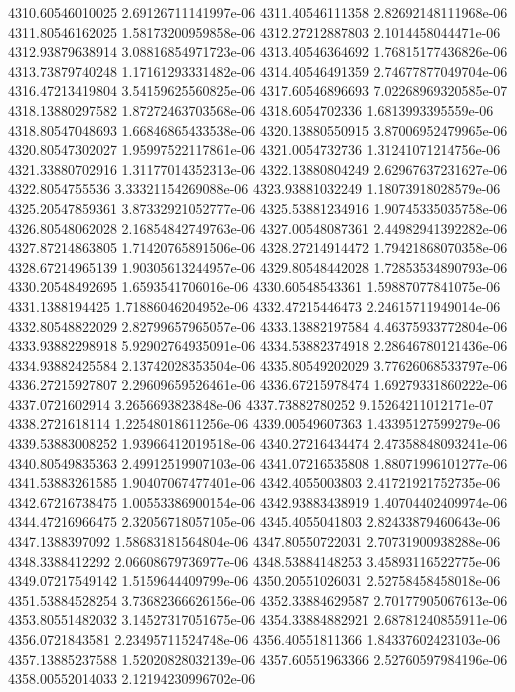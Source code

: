 {4310.60546010025 2.69126711141997e-06
4311.40546111358 2.82692148111968e-06
4311.80546162025 1.58173200959858e-06
4312.27212887803 2.1014458044471e-06
4312.93879638914 3.08816854971723e-06
4313.40546364692 1.76815177436826e-06
4313.73879740248 1.17161293331482e-06
4314.40546491359 2.74677877049704e-06
4316.47213419804 3.54159625560825e-06
4317.60546896693 7.02268969320585e-07
4318.13880297582 1.87272463703568e-06
4318.6054702336 1.6813993395559e-06
4318.80547048693 1.66846865433538e-06
4320.13880550915 3.87006952479965e-06
4320.80547302027 1.95997522117861e-06
4321.0054732736 1.31241071214756e-06
4321.33880702916 1.31177014352313e-06
4322.13880804249 2.62967637231627e-06
4322.8054755536 3.33321154269088e-06
4323.93881032249 1.18073918028579e-06
4325.20547859361 3.87332921052777e-06
4325.53881234916 1.90745335035758e-06
4326.80548062028 2.16854842749763e-06
4327.00548087361 2.44982941392282e-06
4327.87214863805 1.71420765891506e-06
4328.27214914472 1.79421868070358e-06
4328.67214965139 1.90305613244957e-06
4329.80548442028 1.72853534890793e-06
4330.20548492695 1.6593541706016e-06
4330.60548543361 1.59887077841075e-06
4331.1388194425 1.71886046204952e-06
4332.47215446473 2.24615711949014e-06
4332.80548822029 2.82799657965057e-06
4333.13882197584 4.46375933772804e-06
4333.93882298918 5.92902764935091e-06
4334.53882374918 2.28646780121436e-06
4334.93882425584 2.13742028353504e-06
4335.80549202029 3.77626068533797e-06
4336.27215927807 2.29609659526461e-06
4336.67215978474 1.69279331860222e-06
4337.0721602914 3.2656693823848e-06
4337.73882780252 9.15264211012171e-07
4338.2721618114 1.22548018611256e-06
4339.00549607363 1.43395127599279e-06
4339.53883008252 1.93966412019518e-06
4340.27216434474 2.47358848093241e-06
4340.80549835363 2.49912519907103e-06
4341.07216535808 1.88071996101277e-06
4341.53883261585 1.90407067477401e-06
4342.4055003803 2.41721921752735e-06
4342.67216738475 1.00553386900154e-06
4342.93883438919 1.40704402409974e-06
4344.47216966475 2.32056718057105e-06
4345.4055041803 2.82433879460643e-06
4347.1388397092 1.58683181564804e-06
4347.80550722031 2.70731900938288e-06
4348.3388412292 2.06608679736977e-06
4348.53884148253 3.45893116522775e-06
4349.07217549142 1.5159644409799e-06
4350.20551026031 2.52758458458018e-06
4351.53884528254 3.73682366626156e-06
4352.33884629587 2.70177905067613e-06
4353.80551482032 3.14527317051675e-06
4354.33884882921 2.68781240855911e-06
4356.0721843581 2.23495711524748e-06
4356.40551811366 1.84337602423103e-06
4357.13885237588 1.52020828032139e-06
4357.60551963366 2.52760597984196e-06
4358.00552014033 2.12194230996702e-06
}
